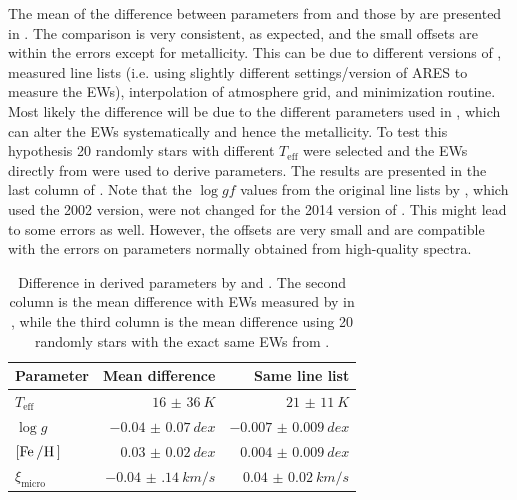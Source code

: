 The mean of the difference between parameters from \citet{Sousa2011} and those by  are
presented in . The comparison is very consistent, as expected, and the small
offsets are within the errors except for metallicity. This can be due to different versions of
, measured line lists (i.e. using slightly different settings/version of ARES to measure
the EWs), interpolation of atmosphere grid, and minimization routine. Most likely the difference
will be due to the different  parameters used in , which can alter the EWs
systematically and hence the metallicity. To test this hypothesis 20 randomly stars with different
$T_\mathrm{eff}$ were selected and the EWs directly from \citet{Sousa2011} were used to derive
parameters. The results are presented in the last column of . Note that the
$\log \mathit{gf}$ values from the original line lists by \citet{Sousa2011}, which used the
 2002 version, were not changed for the 2014 version of . This might lead to
some errors as well. However, the offsets are very small and are compatible with the errors on
parameters normally obtained from high-quality spectra.

\begin{table}[htb!]
    \caption{Difference in derived parameters by \citet{Sousa2011} and . The second
             column is the mean difference with EWs measured by  in , while
             the third column is the mean difference using 20 randomly stars with the exact same EWs
             from \citet{Sousa2011}.}
    \label{tab:FASMATest}
    \centering
    \begin{tabular}{lrr}
      \hline\hline
      Parameter             &  Mean difference         & Same line list        \\
      \hline
      $T_\mathrm{eff}$      &  $\SI{16(36)}{K}$        & $\SI{21(11)}{K}$      \\
      $\log g$              &  $\SI{-0.04(7)}{dex}$    & $\SI{-0.007(9)}{dex}$ \\
      $[\ion{Fe}/\ion{H}]$  &  $\SI{0.03(2)}{dex}$     & $\SI{0.004(9)}{dex}$  \\
      $\xi_\mathrm{micro}$  &  $\SI{-0.04(14)}{km/s}$  & $\SI{0.04(2)}{km/s}$  \\
      \hline
    \end{tabular}
\end{table}
